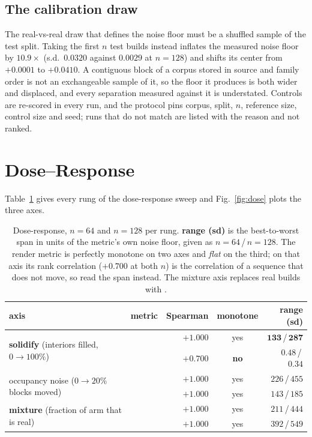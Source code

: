 \subsection{The calibration draw}
\label{app:repro}

The real-vs-real draw that defines the noise floor must be a shuffled sample of
the test split. Taking the first $n$ test builds instead inflates the measured
noise floor by $\mathbf{10.9\times}$ (s.d.\ $0.0320$ against $0.0029$ at
$n{=}128$) and shifts its center from $+0.0001$ to $+0.0410$. A contiguous block
of a corpus stored in source and family order is not an exchangeable sample of
it, so the floor it produces is both wider and displaced, and every separation
measured against it is understated. Controls are re-scored in every run, and the
protocol pins corpus, split, $n$, reference size, control size and seed; runs
that do not match are listed with the reason and not ranked.

\section{Dose--Response}
\label{app:tables}

Table~\ref{tab:dose} gives every rung of the dose-response sweep and
Fig.~\ref{fig:dose} plots the three axes.

\begin{table}[t]
\centering
\small
\caption{Dose-response, $n{=}64$ and $n{=}128$ per rung. \textbf{range (sd)} is the
best-to-worst span in units of the metric's own noise floor, given as
$n{=}64$\,/\,$n{=}128$. The render metric is perfectly
monotone on two axes and \emph{flat} on the third; on that axis its rank
correlation ($+0.700$ at both $n$) is the correlation of a sequence that does not
move, so read the span instead. The mixture axis replaces real builds with \randomvox{}.}
\label{tab:dose}
\begin{tabular}{llrcr}
\toprule
axis & metric & Spearman & monotone & range (sd) \\
\midrule
\multirow{2}{*}{\textbf{solidify} (interiors filled, $0\!\to\!100\%$)}
  & \vkid{} & $+1.000$ & yes & $\mathbf{133}$\,/\,$\mathbf{287}$ \\
  & \mvkid{}   & $+0.700$ & \textbf{no} & $\mathbf{0.48}$\,/\,$\mathbf{0.34}$ \\
\midrule
\multirow{2}{*}{occupancy noise ($0\!\to\!20\%$ blocks moved)}
  & \vkid{} & $+1.000$ & yes & $226$\,/\,$455$ \\
  & \mvkid{}   & $+1.000$ & yes & $143$\,/\,$185$ \\
\midrule
\multirow{2}{*}{\textbf{mixture} (fraction of arm that is real)}
  & \vkid{} & $+1.000$ & yes & $211$\,/\,$444$ \\
  & \mvkid{}   & $+1.000$ & yes & $392$\,/\,$549$ \\
\bottomrule
\end{tabular}
\end{table}

